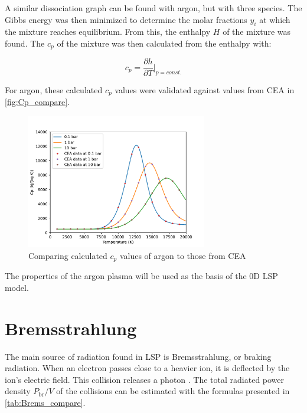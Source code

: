         A similar dissociation graph can be found with argon, but with three species. The Gibbs energy was then minimized to determine the molar fractions $y_i$ at which the mixture reaches equilibrium. From this, the enthalpy $H$ of the mixture was found. The $c_p$ of the mixture was then calculated from the enthalpy with:

        \begin{equation}
            c_p = \frac{\partial h}{\partial T}\bigg|_{p = const.}
        \end{equation}
        
        For argon, these calculated $c_p$ values were validated against values from CEA \cite{CEARUNRev4} in \autoref{fig:Cp_compare}.
        
        \begin{figure}[!ht]
            \centering
            \includegraphics[width=0.7\textwidth]{assets/2 models/Cp_compare.pdf}
            \caption{Comparing calculated $c_p$ values of argon to those from CEA}
            \label{fig:Cp_compare}
        \end{figure}

        The properties of the argon plasma will be used as the basis of the 0D LSP model.
    
    \section{Bremsstrahlung}
        
        The main source of radiation found in LSP is Bremsstrahlung, or braking radiation. When an electron passes close to a heavier ion, it is deflected by the ion's electric field. This collision releases a photon \autocite{glasstoneControlledThermonuclearReactions1975}. The total radiated power density $P_\mathrm{br}/V$ of the collisions can be estimated with the formulas presented in \autoref{tab:Brems_compare}.

